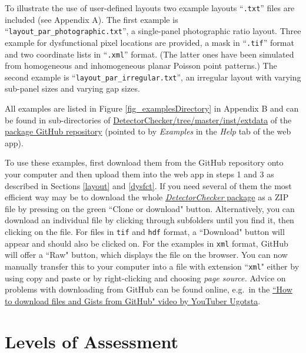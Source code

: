 \documentclass[11pt,a4paper]{article}
\newcommand{\DetectorChecker}{\emph{DetectorChecker}\xspace}
\begin{document}
To illustrate the use of user-defined layouts two example layouts ``\texttt{.txt}'' files are included (see Appendix A). 
The first example is ``\texttt{layout\_par\_photographic.txt}'',  a single-panel photographic ratio layout. Three example for dysfunctional pixel locations are provided, a mask in ``\texttt{.tif}'' format and two coordinate lists in ``\texttt{.xml}'' format. (The latter ones have been simulated from homogeneous and inhomogeneous planar Poisson point patterns.)
The second example is ``\texttt{layout\_par\_irregular.txt}'', an irregular layout with varying sub-panel sizes and varying gap sizes. 

All examples are listed in Figure \ref{fig_examplesDirectory} in Appendix B and can be found in sub-directories of
\href{https://github.com/alan-turing-institute/DetectorChecker/tree/master/inst/extdata}{DetectorChecker/tree/master/inst/extdata} 
of the
\href{https://github.com/alan-turing-institute/DetectorChecker}{package GitHub repository}
(pointed to by \emph{Examples} in the \emph{Help} tab of the web app).

To use these examples, first download them from the GitHub repository onto your computer and then upload them into the web app in steps 1 and 3 as described in Sections \ref{layout} and \ref{dysfct}. If you need several of them the most efficient way may be to download the whole  \href{https://github.com/alan-turing-institute/DetectorChecker}{\DetectorChecker package}
as a ZIP file by pressing on the green ``Clone or download" button. Alternatively, you can download an individual file by clicking through subfolders until you find it, then clicking
on the file. 
For files in \texttt{tif} and \texttt{hdf} format, 
a ``Download" button will appear and should also be clicked on. 
For the examples in \texttt{xml} format, GitHub will offer a ``Raw" button, 
which displays the file on the browser. 
You can now manually transfer this to your computer into a file with extension ``\texttt{xml}" either by using copy and paste or by right-clicking and choosing \emph{page source.} 
Advice on problems with downloading from GitHub can be found online, 
e.g.~in the
\href{https://youtu.be/GIJdfuAoqFI}{``How to download files and Gists from GitHub" video by YouTuber Ugotsta}.


\section{Levels of Assessment}\label{levels}
\end{document}
